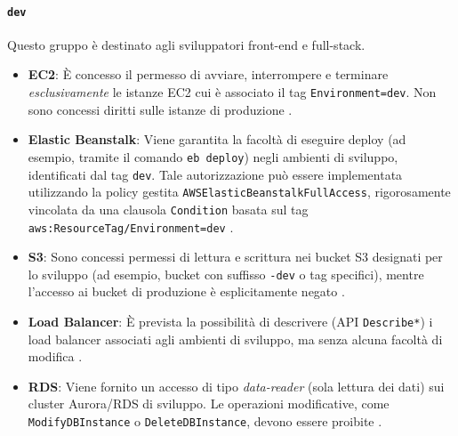 \paragraph{\texttt{dev}}
Questo gruppo è destinato agli sviluppatori front-end e full-stack.
\begin{itemize}
  \item \textbf{EC2}: È concesso il permesso di avviare, interrompere e terminare \emph{esclusivamente} le istanze EC2 cui è associato il tag \texttt{Environment=dev}. Non sono concessi diritti sulle istanze di produzione \cite{AWSEC2IAM}.
  \item \textbf{Elastic Beanstalk}: Viene garantita la facoltà di eseguire deploy (ad esempio, tramite il comando \texttt{eb deploy}) negli ambienti di sviluppo, identificati dal tag \texttt{dev}. Tale autorizzazione può essere implementata utilizzando la policy gestita \texttt{AWSElasticBeanstalkFullAccess}, rigorosamente vincolata da una clausola \texttt{Condition} basata sul tag \texttt{aws:ResourceTag/Environment=dev} \cite{AWSEBRole}.
  \item \textbf{S3}: Sono concessi permessi di lettura e scrittura nei bucket S3 designati per lo sviluppo (ad esempio, bucket con suffisso \texttt{-dev} o tag specifici), mentre l'accesso ai bucket di produzione è esplicitamente negato \cite{AWSS3Security}.
  \item \textbf{Load Balancer}: È prevista la possibilità di descrivere (API \texttt{Describe*}) i load balancer associati agli ambienti di sviluppo, ma senza alcuna facoltà di modifica \cite{AWSELBIAM}.
  \item \textbf{RDS}: Viene fornito un accesso di tipo \emph{data-reader} (sola lettura dei dati) sui cluster Aurora/RDS di sviluppo. Le operazioni modificative, come \texttt{ModifyDBInstance} o \texttt{DeleteDBInstance}, devono essere proibite \cite{AWSRDSIAM}.
\end{itemize}

